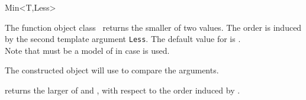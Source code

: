 \begin{ccRefFunctionObjectClass}{Min<T,Less>}

\ccDefinition

The function object class \ccRefName\ returns the smaller of two values.
The order is induced by the second template argument {\tt Less}.
The default value for  is .\\

Note that  must be a model of 
in case  is used. 
 

\ccIsModel
{}

\ccCreation
{}
\ccGlue
{}
        {The constructed object will use  to compare the arguments. }

\ccOperations
{}
{returns the larger of  and , 
with respect to the order induced by . }

\end{ccRefFunctionObjectClass}
